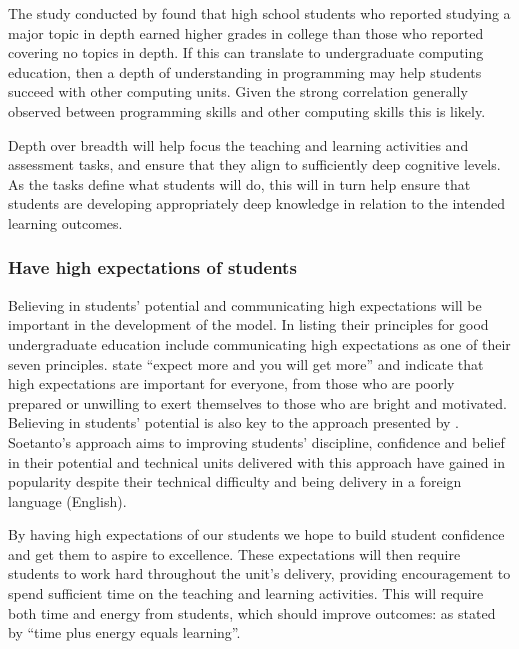 The study conducted by \citet{Schwartz:2009} found that high school students who reported studying a major topic in depth earned higher grades in college than those who reported covering no topics in depth. If this can translate to undergraduate computing education, then a depth of understanding in programming may help students succeed with other computing units. Given the strong correlation generally observed between programming skills and other computing skills \citet{McGettrick:2005} this is likely.

Depth over breadth will help focus the teaching and learning activities and assessment tasks, and ensure that they align to sufficiently deep cognitive levels. As the tasks define what students will do, this will in turn help ensure that students are developing appropriately deep knowledge in relation to the intended learning outcomes.


\subsubsection{Have high expectations of students} %
\label{ssub:have_high_expectations_of_students_}

Believing in students' potential and communicating high expectations will be important in the development of the model. In listing their principles for good undergraduate education \citet{Chickering:1987} include communicating high expectations as one of their seven principles. \citet{Chickering:1987} state ``expect more and you will get more'' and indicate that high expectations are important for everyone, from those who are poorly prepared or unwilling to exert themselves to those who are bright and motivated. Believing in students' potential is also key to the approach presented by \citet{Soetanto:2003,Soetanto:2012}. Soetanto's approach aims to improving students' discipline, confidence and belief in their potential and technical units delivered with this approach have gained in popularity despite their technical difficulty and being delivery in a foreign language (English).

By having high expectations of our students we hope to build student confidence and get them to aspire to excellence. These expectations will then require students to work hard throughout the unit's delivery, providing encouragement to spend sufficient time on the teaching and learning activities. This will require both time and energy from students, which should improve outcomes: as stated by \citet{Chickering:1987} ``time plus energy equals learning''.


